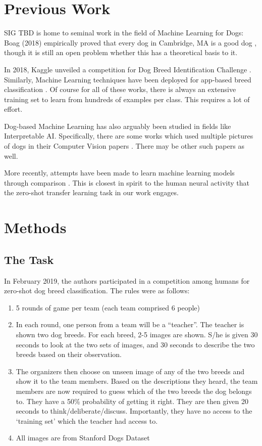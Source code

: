 \documentclass[sigplan,10pt]{acmart}
\begin{document}
\section{Previous Work}
SIG TBD is home to seminal work in the field of Machine Learning for Dogs: Boag (2018) empirically proved that every dog in Cambridge, MA is a good dog \cite{good-dogs}, though it is still an open problem whether this has a theoretical basis to it.

In 2018, Kaggle unveiled a competition for Dog Breed Identification Challenge \cite{kaggle-breed-classification}. Similarly, Machine Learning techniques have been deployed for app-based breed classification \cite{ml-breed-classification}. Of course for all of these works, there is always an extensive training set to learn from hundreds of examples per class. This requires a lot of effort.

Dog-based Machine Learning has also arguably been studied in fields like Interpretable AI. Specifically, there are some works which used multiple pictures of dogs in their Computer Vision papers \cite{interpretable-dogs}. There may be other such papers as well.

More recently, attempts have been made to learn machine learning models through comparison \cite{cmu}. This is closest in spirit to the human neural activity that the zero-shot transfer learning task in our work engages.


\section{Methods}

\subsection{The Task}

In February 2019, the authors participated in a competition among humans for zero-shot dog breed classification. The rules were as follows:

\begin{enumerate}
\item 5 rounds of game per team (each team comprised 6 people)
\item In each round, one person from a team will be a ``teacher''. The teacher is shown two dog breeds. For each breed, 2-5 images are shown. S/he is given 30 seconds to look at the two sets of images, and 30 seconds to describe the two breeds based on their observation.
\item The organizers then choose on unseen image of any of the two breeds and show it to the team members. Based on the descriptions they heard, the team members are now required to guess which of the two breeds the dog belongs to. They have a 50\% probability of getting it right. They are then given 20 seconds to think/deliberate/discuss. Importantly, they have no access to the `training set' which the teacher had access to.
\item All images are from Stanford Dogs Dataset \cite{dognet}
\end{enumerate}
\end{document}
